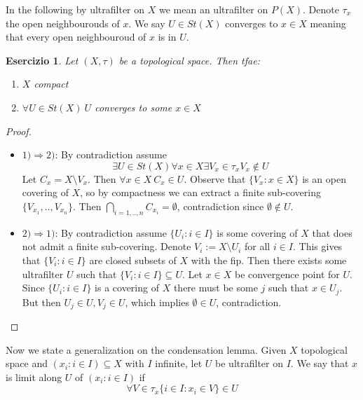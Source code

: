 \documentclass{article}
\newtheorem{exercise}{Esercizio}
\begin{document}
In the following by ultrafilter on $X$ we mean an ultrafilter on $P(X)$. 
Denote $\tau_x$ the open neighbourouds of $x$.
We say $U \in St(X)$ converges to $x \in X$ meaning that every open neighbouroud of $x$ is in $U$.

\begin{exercise}

	Let $(X,\tau)$ be a topological space. Then tfae:
	\begin{enumerate}
		\item	$X$ compact
		\item	$\forall U \in St(X) \ U$ converges to some $x \in X$
	\end{enumerate}

\end{exercise}

\begin{proof}

	\begin{itemize}
		\item	$1) \Rightarrow 2)$:
			By contradiction assume 
			\[
				\exists U \in St(X) \forall x \in X \exists V_x \in \tau_x V_x \not \in U
			\]
			Let $C_x = X \setminus V_x$. Then $\forall x \in X \ C_x \in U$.
			Observe that $\{V_x : x \in X \}$ is an open covering of $X$, so by compactness we can extract a finite sub-covering $\{ V_{x_1},..,V_{x_n}\}$.
			Then $\bigcap_{i=1,..,n} C_{x_i} = \emptyset$, contradiction since $\emptyset \not \in U$.

		\item	$2) \Rightarrow 1)$:
			By contradiction assume $\{U_i : i \in I \}$ is some covering of $X$ that does not admit a finite sub-covering.
			Denote $V_i := X \setminus U_i$ for all $i \in I$. This gives that $\{V_i : i \in I\}$ are closed subsets of $X$ with the fip.
			Then there exists some ultrafilter $U$ such that $\{V_i : i \in I\} \subseteq U$.
			Let $x \in X$ be convergence point for $U$.
			Since $\{U_i : i \in I\}$ is a covering of $X$ there must be some $j$ such that $x \in U_j$.
			But then $U_j \in U, V_j \in U$, which implies $\emptyset \in U$, contradiction.
	\end{itemize}

\end{proof}


Now we state a generalization on the condensation lemma. Given $X$ topological space and $(x_i : i \in I) \subseteq X$ with $I$ infinite, let $U$ be ultrafilter on $I$.
We say that $x$ is limit along $U$ of $(x_i : i \in I)$ if 
\[
	\forall V \in \tau_x \{ i \in I : x_i \in V \} \in U
\]
\end{document}
